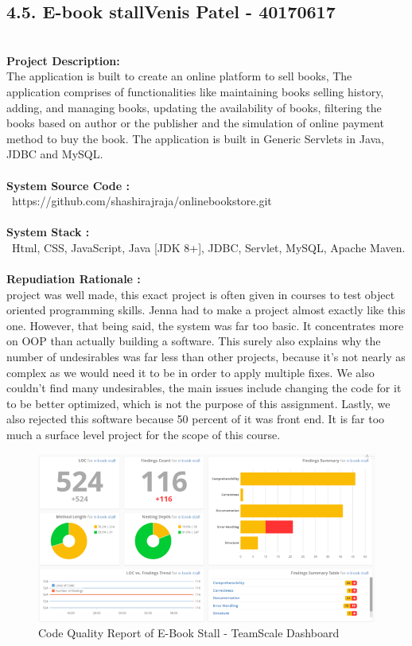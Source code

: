 \documentclass[letterpaper, 11pt]{report}
\begin{document}
\subsection*{4.5. E-book stall\hfill {\normalsize{Venis Patel - 40170617}}} \\
\normalsize {\textbf{Project Description:}} \\
\normalsize {The application is built to create an online platform to sell books, The application comprises of functionalities like maintaining books selling history, adding, and managing books, updating the availability of books, filtering the books based on author or the publisher and the simulation of online payment method to buy the book. The application is built in Generic Servlets in Java, JDBC and MySQL.}\\
\\
\normalsize{\textbf{System Source Code :}} \\
\normalsize{\ https://github.com/shashirajraja/onlinebookstore.git}\\
\\
\normalsize{\textbf{System Stack :}}\\
\normalsize{\ Html, CSS, JavaScript, Java [JDK 8+], JDBC, Servlet, MySQL, Apache Maven.}\\
\\
\normalsize{\textbf{Repudiation Rationale : }}\\
\normalsize{\This project was well made, this exact project is often given in courses to test object oriented programming skills. Jenna had to make a project almost exactly like this one. However, that being said, the system was far too basic. It concentrates more on OOP than actually building a software. This surely also explains why the number of undesirables was far less than other projects, because it’s not nearly as complex as we would need it to be in order to apply multiple fixes. We also couldn’t find many undesirables, the main issues include changing the code for it to be better optimized, which is not the purpose of this assignment. Lastly, we also rejected this software because 50 percent of it was front end. It is far too much a surface level project for the scope of this course.}
\\
\begin{figure}[htb]
\begin{center}
\includegraphics[width=13cm]{D1-Reengineering Opportunity/images/Picture5.png}
\caption{Code Quality Report of E-Book Stall - TeamScale Dashboard}
\end{center}
\end{figure}
\pagebreak
{}
\end{document}

